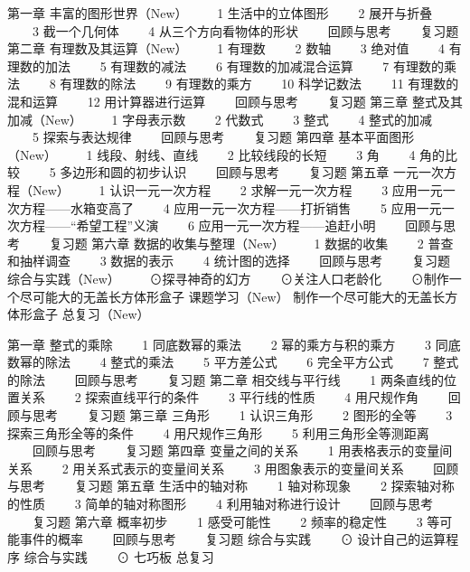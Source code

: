 第一章 丰富的图形世界（New）
　　1 生活中的立体图形
　　2 展开与折叠
　　3 截一个几何体
　　4 从三个方向看物体的形状
　　回顾与思考
　　复习题
第二章 有理数及其运算（New）
　　1 有理数
　　2 数轴
　　3 绝对值
　　4 有理数的加法
　　5 有理数的减法
　　6 有理数的加减混合运算
　　7 有理数的乘法
　　8 有理数的除法
　　9 有理数的乘方
　　10 科学记数法
　　11 有理数的混和运算
　　12 用计算器进行运算
　　回顾与思考
　　复习题
第三章 整式及其加减（New）
　　1 字母表示数
　　2 代数式
　　3 整式
　　4 整式的加减
　　5 探索与表达规律
　　回顾与思考
　　复习题
第四章 基本平面图形（New）
　　1 线段、射线、直线
　　2 比较线段的长短
　　3 角
　　4 角的比较
　　5 多边形和圆的初步认识
　　回顾与思考
　　复习题
第五章 一元一次方程（New）
　　1 认识一元一次方程
　　2 求解一元一次方程
　　3 应用一元一次方程——水箱变高了
　　4 应用一元一次方程——打折销售
　　5 应用一元一次方程——“希望工程”义演
　　6 应用一元一次方程——追赶小明
　　回顾与思考
　　复习题
第六章 数据的收集与整理（New）
　　1 数据的收集
　　2 普查和抽样调查
　　3 数据的表示
　　4 统计图的选择
　　回顾与思考
　　复习题
综合与实践（New）
　　⊙探寻神奇的幻方
　　⊙关注人口老龄化
　　⊙制作一个尽可能大的无盖长方体形盒子
课题学习（New）
制作一个尽可能大的无盖长方体形盒子
总复习（New）


第一章 整式的乘除
　　1 同底数幂的乘法
　　2 幂的乘方与积的乘方
　　3 同底数幂的除法
　　4 整式的乘法
　　5 平方差公式
　　6 完全平方公式
　　7 整式的除法
　　回顾与思考
　　复习题
第二章 相交线与平行线
　　1 两条直线的位置关系
　　2 探索直线平行的条件
　　3 平行线的性质
　　4 用尺规作角
　　回顾与思考
　　复习题
第三章 三角形
　　1 认识三角形
　　2 图形的全等
　　3 探索三角形全等的条件
　　4 用尺规作三角形
　　5 利用三角形全等测距离
　　回顾与思考
　　复习题
第四章 变量之间的关系
　　1 用表格表示的变量间关系
　　2 用关系式表示的变量间关系
　　3 用图象表示的变量间关系
　　回顾与思考
　　复习题
第五章 生活中的轴对称
　　1 轴对称现象
　　2 探索轴对称的性质
　　3 简单的轴对称图形
　　4 利用轴对称进行设计
　　回顾与思考
　　复习题
第六章 概率初步
　　1 感受可能性
　　2 频率的稳定性
　　3 等可能事件的概率
　　回顾与思考
　　复习题
综合与实践
　　⊙ 设计自己的运算程序
综合与实践
　　⊙ 七巧板
总复习


